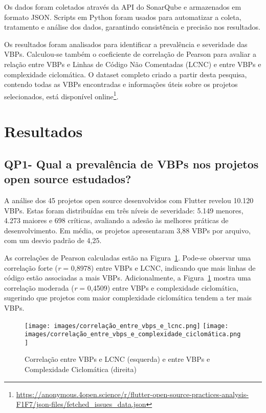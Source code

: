 \documentclass[12pt]{article}
\begin{document}
Os dados foram coletados através da API do SonarQube e armazenados em formato JSON. Scripts em Python foram usados para automatizar a coleta, tratamento e análise dos dados, garantindo consistência e precisão nos resultados. 

Os resultados foram analisados para identificar a prevalência e severidade das VBPs. Calculou-se também o coeficiente de correlação de Pearson para avaliar a relação entre VBPs e Linhas de Código Não Comentadas (LCNC) e entre VBPs e complexidade ciclomática. O dataset completo criado a partir desta pesquisa, contendo todas as VBPs encontradas e informações úteis sobre os projetos selecionados, está disponível online\footnote{\url{https://anonymous.4open.science/r/flutter-open-source-practices-analysis-F1F7/json-files/fetched_issues_data.json}}.

\section{Resultados}
\subsection{QP1- Qual a prevalência de VBPs nos projetos open source estudados?}
A análise dos 45 projetos open source desenvolvidos com Flutter revelou 10.120 VBPs. Estas foram distribuídas em três níveis de severidade: 5.149 menores, 4.273 maiores e 698 críticas, avaliando a adesão às melhores práticas de desenvolvimento. Em média, os projetos apresentaram 3,88 VBPs por arquivo, com um desvio padrão de 4,25. %

As correlações de Pearson calculadas estão na Figura~\ref{fig:vbps_vs_lcnc_and_vbps_vs_complexity}. Pode-se observar uma correlação forte (\textit{r} = 0,8978) entre VBPs e LCNC, indicando que mais linhas de código estão associadas a mais VBPs. Adicionalmente, a Figura~\ref{fig:vbps_vs_lcnc_and_vbps_vs_complexity} mostra uma correlação moderada (\textit{r} = 0,4509) entre VBPs e complexidade ciclomática, sugerindo que projetos com maior complexidade ciclomática tendem a ter mais VBPs.

\begin{figure}[H]
\centering
\texttt{[image: images/correlação\_entre\_vbps\_e\_lcnc.png]}
\texttt{[image: images/correlação\_entre\_vbps\_e\_complexidade\_ciclomática.png]}
\caption{Correlação entre VBPs e LCNC (esquerda) e entre VBPs e Complexidade Ciclomática (direita)}
\label{fig:vbps_vs_lcnc_and_vbps_vs_complexity}
\end{figure}
\end{document}
